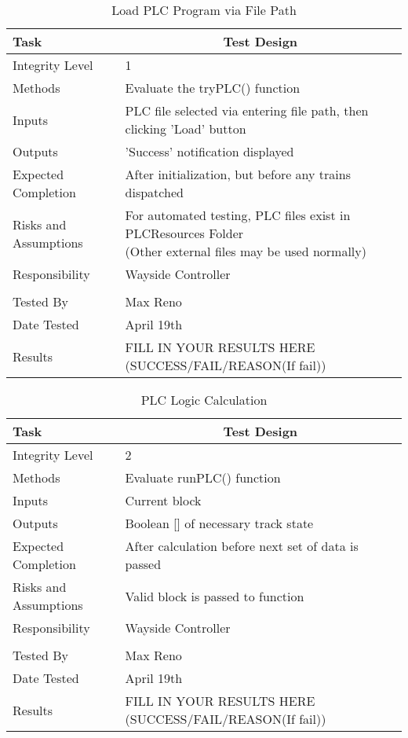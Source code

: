 \documentclass[]{article}
\begin{document}
\begin{table}[H]
	\centering
	\caption{Load PLC Program via File Path}
	\begin{tabular}{|l|l|}
		\hline
		Task & \multicolumn{1}{c|}{Test Design} \\ \hline
		Integrity Level & 1 \\ \hline
		Methods & Evaluate the tryPLC() function\\ \hline
		Inputs &  PLC file selected via entering file path, then clicking 'Load' button \\ \hline
		Outputs &  'Success' notification displayed \\ \hline
		Expected Completion & After initialization, but before any trains dispatched\\ \hline
		Risks and Assumptions & \parbox[t]{10cm}{For automated testing, PLC files exist in PLCResources Folder \\(Other external files may be used normally)} \\ \hline
		Responsibility & Wayside Controller\\ \hline
		\\ \hline
		Tested By   &  Max Reno\\	\hline
		Date Tested & \parbox[t]{10cm}{April 19th}\\ \hline
		Results & FILL IN YOUR RESULTS HERE (SUCCESS/FAIL/REASON(If fail))\\ \hline
	\end{tabular}
\end{table}

\begin{table}[H]
	\centering
	\caption{PLC Logic Calculation}
	\begin{tabular}{|l|l|}
		\hline
		Task & \multicolumn{1}{c|}{Test Design} \\ \hline
		Integrity Level & 2 \\ \hline
		Methods & Evaluate runPLC() function\\ \hline
		Inputs &  Current block \\ \hline
		Outputs &  Boolean [] of necessary track state \\ \hline
		Expected Completion & After calculation before next set of data is passed\\ \hline
		Risks and Assumptions & \parbox[t]{10cm}{Valid block is passed to function} \\ \hline
		Responsibility & Wayside Controller\\ \hline
		\\ \hline
		Tested By   &  Max Reno\\	\hline
		Date Tested & \parbox[t]{10cm}{April 19th}\\ \hline
		Results & FILL IN YOUR RESULTS HERE (SUCCESS/FAIL/REASON(If fail))\\ \hline
	\end{tabular}
\end{table}
\end{document}
